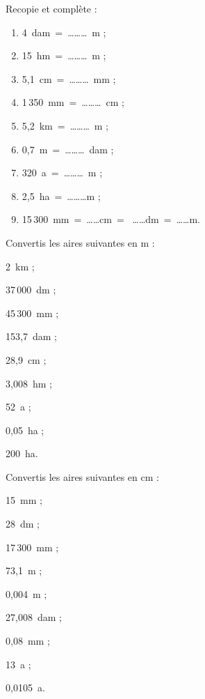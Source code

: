\begin{exercice}
Recopie et complète :
\begin{enumerate}
 \item 4 dam = \ldots \ldots \ldots m ;
 \item 15 hm = \ldots \ldots \ldots m ;
 \item 5,1 cm = \ldots \ldots \ldots mm ;
 \item 1\,350 mm = \ldots \ldots \ldots cm ;
 \item 5,2 km = \ldots \ldots \ldots m ;
 \item 0,7 m = \ldots \ldots \ldots dam ;
 \item 320 a = \ldots \ldots \ldots m ;
 \item 2,5 ha = \ldots \ldots \ldots m ;
 \item 15\,300 mm = \ldots\ldots cm =  \ldots\ldots dm = \ldots\ldots m.
 \end{enumerate}
\end{exercice}


\begin{exercice}
Convertis les aires suivantes en m :
\begin{colenumerate}{3}
 \item 2 km ;
 \item 37\,000 dm ;
 \item 45\,300 mm ;
 \item 153,7 dam ;
 \item 28,9 cm ;
 \item 3,008 hm ;
 \item 52 a ;
 \item 0,05 ha ;
 \item 200 ha.
 \end{colenumerate}
\end{exercice}


\begin{exercice}
Convertis les aires suivantes en cm :
\begin{colenumerate}{3}
 \item 15 mm ;
 \item 28 dm ;
 \item 17\,300 mm ;
 \item 73,1 m ;
 \item 0,004 m ;
 \item 27,008 dam ;
 \item 0,08 mm ;
 \item 13 a ;
 \item 0,0105 a.
 \end{colenumerate}
\end{exercice}


